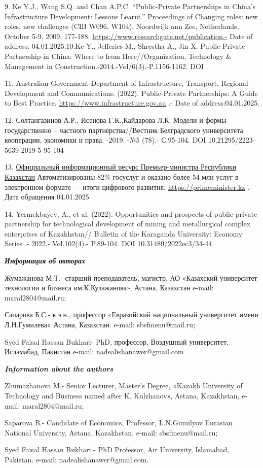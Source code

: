 \begin{references}
9. Ke Y.J., Wang S.Q. and Chan A.P.C. ``Public-Private Partnerships in
China's Infrastructure Development: Lessons Learnt.'' Proceedings of
Changing roles: new roles, new challenges (CIB W096, W104), Noordwijk
ann Zee, Netherlands, October 5-9, 2009, 177-188.
\url{https://www.researchgate.net/publication.-} Date of address:
04.01.2025.10.Ke Y., Jefferies M., Shrestha A., Jin X. Public Private Partnership
in China: Where to from Here//Organization, Technology \& Management in
Construction.-2014.-Vol/6(3).-P.1156-1162. DOI
\href{http://dx.doi.org/10.5592/otmcj.2014.3.10}{}

11. Australian Government Department of Infrastructure, Transport,
Regional Development and Communications. (2022). Public-Private
Partnerships: A Guide to Best Practice.
\href{https://www.infrastructure.gov.au/infrastructure-transport}{https://www.infrastructure.gov.au} .- Date
of address:04.01.2025.

12. Солтангазинов А.Р., Исенова Г.К.,Кайдарова Л.К. Модели и формы
государственно -- частного партнерства//Вестник Белградского
университета кооперации, экономики и права. -2019. -№5 (78).- С.95-104.
DOI 10.21295/2223-5639-2019-5-95-104

13. \href{https://primeminister.kz/ru}{Официальный информационный ресурс
Премьер-министра Республики Казахстан} Автоматизированы 82\% госуслуг и
оказано более 54 млн услуг в электронном формате --- итоги цифрового
развития. \href{https://primeminister.kz/ru/news}{https://primeminister.kz} .- Дата
обращения 04.01.2025

14. Yermekbayev, A., et al. (2022). Opportunities and prospects of
public-private partnership for technological development of mining and
metallurgical complex enterprises of Kazakhstan// Bulletin of the
Karaganda University: Economy Series .- 2022.- Vol.102(4).-
P.89-104. DOI 10.31489/2022ec3/34-44
\end{references}

\begin{affiliation}
\emph{{\bfseries Информация об авторах}}

Жумажанова М.Т.- старший преподаватель, магистр, АО «Казахский
университет технологии и бизнеса им.К.Кулажанова», Астана, Казахстан
e-mail: maral2804@mail.ru;

Сапарова Б.С.- к.э.н., профессор «Евразийский национальный университет
имени Л.Н.Гумилева» Астана, Казахстан. e-mail: sbsfmenu@mail.ru;

Syed Faisal Hassan Bukhari- PhD, профессор, Воздушный университет,
Исламабад, Пакистан e-mail: nadealishanawer@gmail.com

\emph{{\bfseries Information about the authors}}

Zhumazhanova M.- Senior Lecturer, Master's Degree, «Kazakh University of
Technology and Business named after K. Kulzhanov», Astana, Kazakhstan,
e-mail: maral2804@mail.ru;

Saparova B.- Candidate of Economics, Professor, L.N.Gumilyov Eurasian
National University, Astana, Kazakhstan, e-mail: sbsfmenu@mail.ru;

Syed Faisal Hassan Bukhari - PhD Professor, Air University, Islamabad,
Pakistan. e-mail: nadealishanawer@gmail.com.
\end{affiliation}
